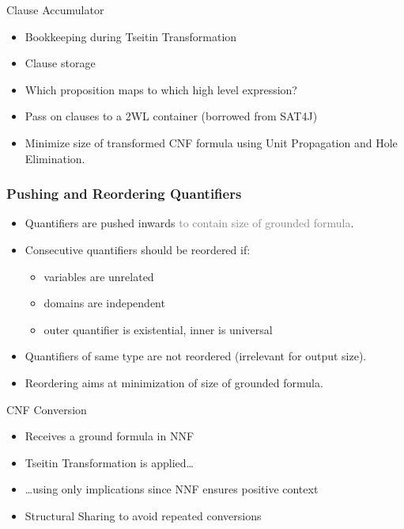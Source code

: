 \documentclass[smaller,dvipsnames,ratio=169]{beamer}
\begin{document}
  \begin{frame}{Clause Accumulator}
    \begin{itemize}
      \item \alert{Bookkeeping} during Tseitin Transformation
      \item Clause storage
      \item Which proposition maps to which high level expression?
      \item Pass on clauses to a 2WL container (borrowed from SAT4J)
      \item \alert{Minimize} size of transformed CNF formula using Unit Propagation and Hole Elimination.
    \end{itemize}
  \end{frame}
  
  \begin{frame}
    \frametitle{Pushing and Reordering Quantifiers}
    \begin{itemize}
      \item Quantifiers are pushed \alert{inwards} \textcolor{gray}{to contain size of grounded formula}.
      \item Consecutive quantifiers should be reordered if:
      \begin{itemize}
        \item variables are \alert{unrelated}
        \item domains are \alert{independent}
        \item outer quantifier is existential, inner is universal
      \end{itemize}
      \item Quantifiers of same type are not reordered (irrelevant for output size).
      \item Reordering aims at \alert{minimization} of size of grounded formula.
    \end{itemize}
  \end{frame}

  \begin{frame}{CNF Conversion}
    \begin{itemize}
      \item Receives a ground formula in NNF
      \item \alert{Tseitin Transformation} is applied\ldots
      \item \ldots{}using only \alert{implications} since NNF ensures positive context
      \item Structural \alert{Sharing} to avoid repeated conversions %
    \end{itemize}
  \end{frame}
\end{document}
